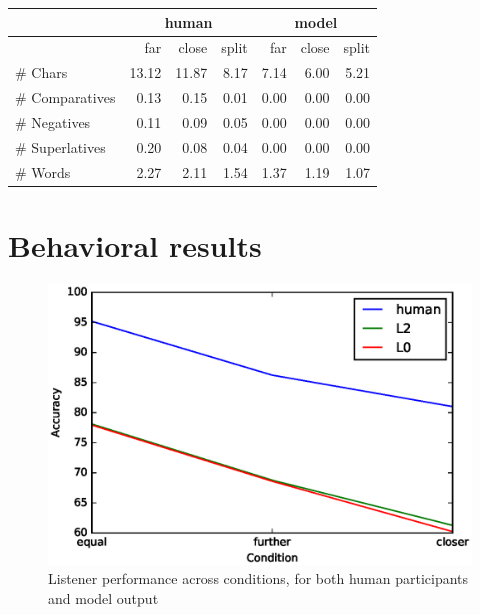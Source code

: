 \documentclass[11pt,letterpaper]{article}
\renewcommand{\|}{\mid}
\begin{document}
\begin{table}[t]
\centering
\begin{tabular}{lrrr|rrr}
  & \multicolumn{3}{c}{human}& \multicolumn{3}{c}{model}\\ \hline
  & far& close& split& far& close& split\\ \hline
\# Chars & 13.12 & 11.87 & 8.17 & 7.14 & 6.00 & 5.21 \\ 
  \# Comparatives & 0.13 & 0.15 & 0.01 & 0.00 & 0.00 & 0.00 \\ 
  \# Negatives & 0.11 & 0.09 & 0.05 & 0.00 & 0.00 & 0.00 \\ 
  \# Superlatives & 0.20 & 0.08 & 0.04 & 0.00 & 0.00 & 0.00 \\ 
  \# Words & 2.27 & 2.11 & 1.54 & 1.37 & 1.19 & 1.07 \\ 
   \hline
\end{tabular}
\label{table:metrics}
\end{table}


\section{Behavioral results}

\begin{figure}
\includegraphics[scale = .5]{figures/allListenerAccuracy.eps}
\caption{Listener performance across conditions, for both human participants and model output}
\label{fig:listenerAccuracy}
\end{figure}
\end{document}
